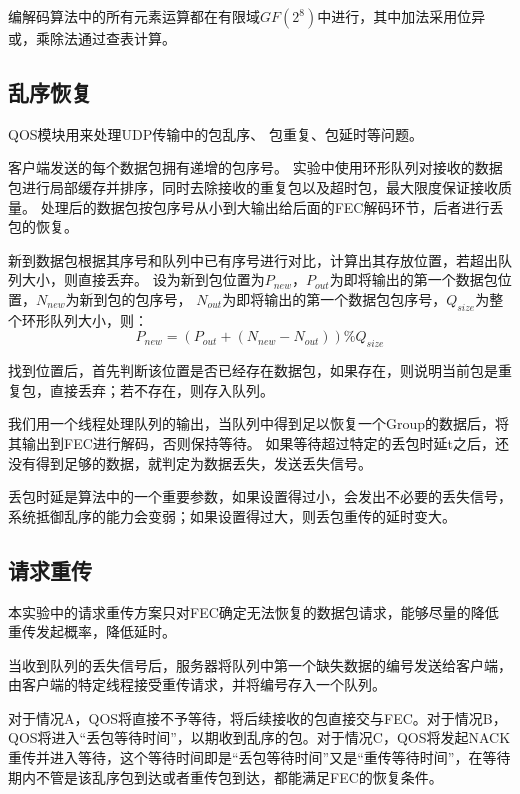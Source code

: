 \documentclass[onecolumn]{article}
\begin{document}
\begin{CJK*}{UTF8}{gbsn}
		编解码算法中的所有元素运算都在有限域$GF(2^8)$中进行，其中加法采用位异或，乘除法通过查表计算。
		
		\subsection{乱序恢复}
		QOS模块用来处理UDP传输中的包乱序、 包重复、包延时等问题。
		
		客户端发送的每个数据包拥有递增的包序号。
		实验中使用环形队列对接收的数据包进行局部缓存并排序，同时去除接收的重复包以及超时包，最大限度保证接收质量。
		处理后的数据包按包序号从小到大输出给后面的FEC解码环节，后者进行丢包的恢复。
		
		新到数据包根据其序号和队列中已有序号进行对比，计算出其存放位置，若超出队列大小，则直接丢弃。
		设为新到包位置为$P_{new}$，$P_{out}$为即将输出的第一个数据包位置，$N_{new} $为新到包的包序号， $N_{out} $为即将输出的第一个数据包包序号，$Q_{size}$为整个环形队列大小，则：
		$$P_{new} = (P_{out} + (N_{new} - N_{out}))\%Q_{size}$$
		
		找到位置后，首先判断该位置是否已经存在数据包，如果存在，则说明当前包是重复包，直接丢弃；若不存在，则存入队列。
		
		我们用一个线程处理队列的输出，当队列中得到足以恢复一个Group的数据后，将其输出到FEC进行解码，否则保持等待。
		如果等待超过特定的丢包时延t之后，还没有得到足够的数据，就判定为数据丢失，发送丢失信号。
		
		丢包时延是算法中的一个重要参数，如果设置得过小，会发出不必要的丢失信号，系统抵御乱序的能力会变弱；如果设置得过大，则丢包重传的延时变大。
		
		\subsection{请求重传}
		本实验中的请求重传方案只对FEC确定无法恢复的数据包请求，能够尽量的降低重传发起概率，降低延时。
		
		当收到队列的丢失信号后，服务器将队列中第一个缺失数据的编号发送给客户端，由客户端的特定线程接受重传请求，并将编号存入一个队列。
		
		对于情况A，QOS将直接不予等待，将后续接收的包直接交与FEC。对于情况B，QOS将进入“丢包等待时间”，以期收到乱序的包。对于情况C，QOS将发起NACK重传并进入等待，这个等待时间即是“丢包等待时间”又是“重传等待时间”，在等待期内不管是该乱序包到达或者重传包到达，都能满足FEC的恢复条件。
		

\end{CJK*}
\end{document}
